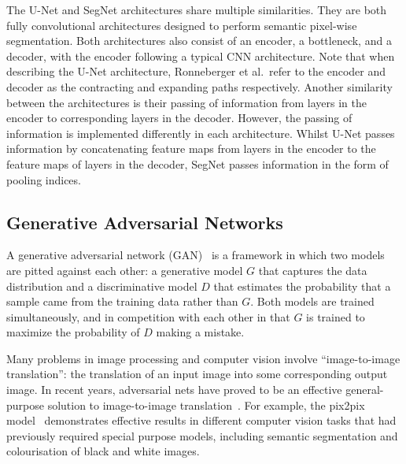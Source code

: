 The U-Net and SegNet architectures share multiple similarities. They are both fully convolutional architectures designed to perform semantic pixel-wise segmentation. Both architectures also consist of an encoder, a bottleneck, and a decoder, with the encoder following a typical CNN architecture. Note that when describing the U-Net architecture, Ronneberger et al.\ refer to the encoder and decoder as the contracting and expanding paths respectively. Another similarity between the architectures is their passing of information from layers in the encoder to corresponding layers in the decoder. However, the passing of information is implemented differently in each architecture. Whilst U-Net passes information by concatenating feature maps from layers in the encoder to the feature maps of layers in the decoder, SegNet passes information in the form of pooling indices.


\subsection{Generative Adversarial Networks}

A generative adversarial network (GAN)~\cite{gans} is a framework in which two models are pitted against each other: a generative model $G$ that captures the data distribution and a discriminative model $D$ that estimates the probability that a sample came from the training data rather than $G$. Both models are trained simultaneously, and in competition with each other in that $G$ is trained to maximize the probability of $D$ making a mistake.

Many problems in image processing and computer vision involve ``image-to-image translation'': the translation of an input image into some corresponding output image. In recent years, adversarial nets have proved to be an effective general-purpose solution to image-to-image translation~\cite{gansoverview}. For example, the pix2pix model~\cite{pix2pix} demonstrates effective results in different computer vision tasks that had previously required special purpose models, including semantic segmentation and colourisation of black and white images.


